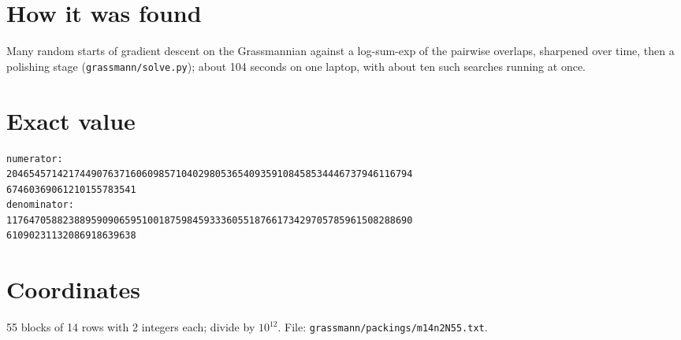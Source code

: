 \documentclass[11pt,a4paper]{article}
\begin{document}
\section{How it was found}
Many random starts of gradient descent on the Grassmannian against a log-sum-exp of the pairwise overlaps, sharpened over time, then a polishing stage (\texttt{grassmann/solve.py}); about 104 seconds on one laptop, with about ten such searches running at once.


\appendix
\section{Exact value}
{\small
\begin{verbatim}
numerator:
204654571421744907637160609857104029805365409359108458534446737946116794
67460369061210155783541
denominator:
117647058823889590906595100187598459333605518766173429705785961508288690
61090231132086918639638
\end{verbatim}}

\section{Coordinates}
55 blocks of 14 rows with 2 integers each; divide by $10^{12}$. File: \texttt{grassmann/packings/m14n2N55.txt}.
{\tiny
\begin{multicols}{4}
\end{multicols}}
\end{document}
